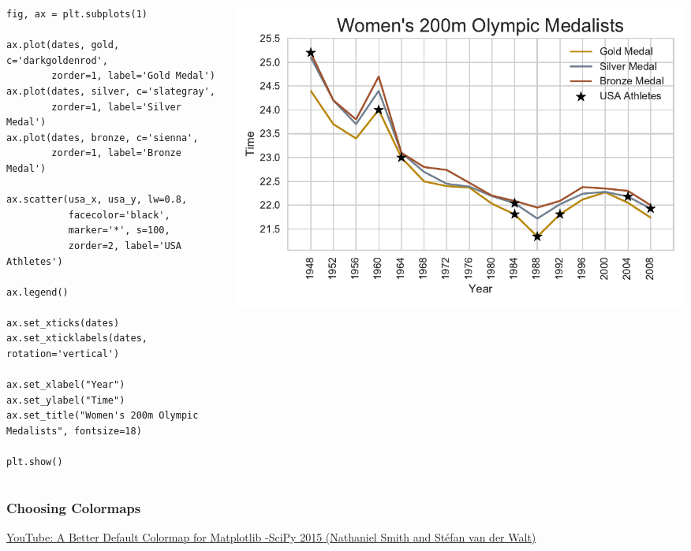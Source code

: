 \documentclass{beamer}
\begin{document}
\begin{frame}[fragile]
\tiny{
\begin{columns}
\begin{column}{0.45\textwidth}
\begin{verbatim}
fig, ax = plt.subplots(1)

ax.plot(dates, gold, c='darkgoldenrod',
        zorder=1, label='Gold Medal')
ax.plot(dates, silver, c='slategray',
        zorder=1, label='Silver Medal')
ax.plot(dates, bronze, c='sienna',
        zorder=1, label='Bronze Medal')

ax.scatter(usa_x, usa_y, lw=0.8,
           facecolor='black',
           marker='*', s=100,
           zorder=2, label='USA Athletes')

ax.legend()

ax.set_xticks(dates)
ax.set_xticklabels(dates, rotation='vertical')

ax.set_xlabel("Year")
ax.set_ylabel("Time")
ax.set_title("Women's 200m Olympic Medalists", fontsize=18)

plt.show()
\end{verbatim}
\end{column}
\begin{column}{0.55\textwidth}
\includegraphics[width=\textwidth]{olympics_8.pdf}
\end{column}
\end{columns}
}
\end{frame}

\begin{frame}
\frametitle{Choosing Colormaps}
\begin{center}
\textcolor{orange}{
\href{https://www.youtube.com/watch?v=xAoljeRJ3lU}{YouTube: A Better Default Colormap for Matplotlib -\newline SciPy 2015 (Nathaniel Smith and Stéfan van der Walt)}
}
\end{center}
\end{frame}
\end{document}
